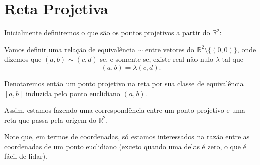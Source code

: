 \chapter{Reta Projetiva}

Inicialmente definiremos o que são os pontos projetivos a partir do $\mathbb{R}^2$:

\begin{defn}
Vamos definir uma relação de equivalência \(\sim\) entre vetores do $\mathbb{R}^2 \setminus \{(0, 0)\}$,
onde dizemos que \((a,b) \sim (c,d)\) se, e somente se, existe real não nulo \(\lambda\) tal que \[(a,b)=\lambda (c,d).\]

Denotaremos então um ponto projetivo na reta por sua classe de equivalência $[a,b]$ induzida pelo ponto euclidiano $(a,b)$.
\end{defn} 

Assim, estamos fazendo uma correspondência entre um ponto projetivo e uma reta que passa pela origem do $\mathbb{R}^2$.

Note que, em termos de coordenadas, só estamos interessados na razão entre as coordenadas de um ponto euclidiano (exceto quando uma delas é zero, o que é fácil de lidar). 
